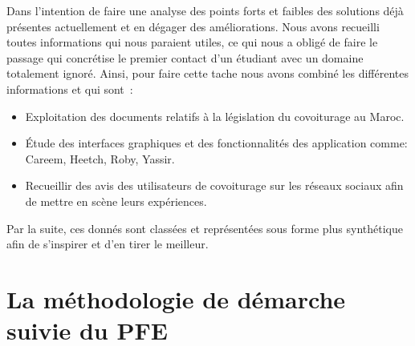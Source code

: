 Dans l'intention de faire une analyse des points forts et faibles des solutions déjà présentes actuellement et en dégager des améliorations. Nous avons recueilli toutes informations qui nous paraient utiles, ce qui nous a obligé de faire le passage qui concrétise le premier contact d'un étudiant avec un domaine totalement ignoré.\newline
Ainsi, pour faire cette tache nous avons combiné les différentes informations et qui sont : 
\begin{itemize}
	\item Exploitation des documents relatifs à la législation du covoiturage au Maroc.
	\item Étude des interfaces graphiques et des fonctionnalités des application comme: Careem, Heetch, Roby, Yassir.
	\item Recueillir des avis des utilisateurs de covoiturage sur les réseaux sociaux afin de mettre en scène leurs expériences.
\end{itemize}
Par la suite, ces donnés sont classées et représentées sous forme plus synthétique afin de s'inspirer et d'en tirer le meilleur.

\section{La méthodologie de démarche suivie du PFE}


